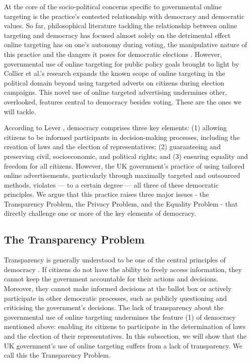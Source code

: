 \documentclass[preprint]{acmart}
\begin{document}
At the core of the socio-political concerns specific to governmental online targeting is the practice's contested relationship with democracy and democratic values. So far, philosophical literature tackling the relationship between online targeting and democracy has focused almost solely on the detrimental effect online targeting has on one's autonomy during voting, the manipulative nature of this practice and the dangers it poses for democratic elections \cite{Susserand2019, Susser20192, zuiderveen2018, barnhill}. However, governmental use of online targeting for public policy goals brought to light by Collier et al.'s research \cite{Collier2022} expands the known scope of online targeting in the political domain beyond using targeted adverts on citizens during election campaigns. This novel use of online targeted advertising undermines other, overlooked, features central to democracy besides voting. These are the ones we will tackle.


According to Lever \cite{lever2006}, democracy comprises three key elements: (1) allowing citizens to be informed participants in decision-making processes, including the creation of laws and the election of representatives; (2) guaranteeing and preserving civil, socioeconomic, and political rights; and (3) ensuring equality and freedom for all citizens. However, the UK government's practice of using tailored online advertisements, particularly through maximally targeted and outsourced methods, violates --- to a certain degree --- all three of these democratic principles. We argue that this practice raises three major issues - the Transparency Problem, the Privacy Problem, and the Equality Problem - that directly challenge one or more of the key elements of democracy.


\subsection{The Transparency Problem }

Transparency is generally understood to be one of the central principles of democracy \cite{rosendorff2006}. If citizens do not have the ability to freely access information, they cannot keep the government accountable for their actions and decisions. Moreover, they cannot make informed decisions at the ballot box or actively participate in other democratic processes, such as publicly questioning and criticising the government's decisions. The lack of transparency about the governmental use of online targeting undermines the feature (1) of democracy mentioned above: enabling its citizens to participate in the determination of laws and the election of their representatives. In this subsection, we will show that the UK government's use of online targeting suffers from a lack of transparency. We call this the Transparency Problem. 
\end{document}
